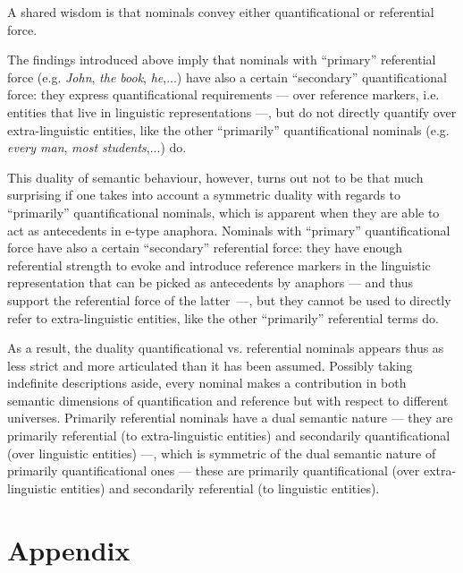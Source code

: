 \documentclass[output=paper
,modfonts
,nonflat]{langsci/langscibook}
\begin{document}
A shared wisdom is that nominals convey either quantificational or referential
force. 

The findings introduced above imply that nominals with ``primary'' referential force 
(e.g. {\em John}, {\em the book}, {\em he},...) have also a certain ``secondary'' quantificational force: 
they express quantificational requirements --- over reference markers, i.e. entities that live in linguistic 
representations ---, but do not directly  quantify  over  extra-linguistic  
entities,  like  the  other  ``primarily'' quantificational nominals 
(e.g. {\em every man}, {\em most students},...) do.

This  duality  of  semantic  behaviour,  however,  turns  out  not  to  be  that  much
surprising  if  one  takes into account  a  symmetric  duality  with  regards  to  ``primarily'' quantificational
nominals, which is apparent when they are able to act as antecedents in e-type anaphora. 
Nominals  with  ``primary''  quantificational 
force have also a certain ``secondary'' referential force: they
have enough referential strength to evoke and introduce reference markers in the
linguistic representation that can be picked as antecedents by anaphors --- and
thus support the referential force of the latter~---, but they cannot be used to directly refer 
to extra-linguistic entities, like the other ``primarily'' referential terms do.

As a result, the duality quantificational vs. referential nominals appears thus as less strict and more articulated 
than it has been assumed. Possibly
taking indefinite descriptions aside, every nominal makes a contribution in both semantic  dimensions  
of  quantification  and  reference  but  with  respect  to  different
universes. Primarily referential nominals have a dual semantic nature --- they are
primarily referential (to extra-linguistic entities) and secondarily quantificational 
(over linguistic entities) ---, which is symmetric of
the  dual semantic  nature  of  primarily  quantificational  ones --- these  are  primarily
quantificational (over extra-linguistic entities) and secondarily referential (to linguistic
entities).







\appendix
\section*{Appendix \label{verif}}
\setcounter{section}{1}
\end{document}
